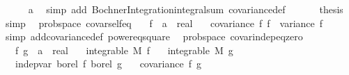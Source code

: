 \begin{isabellebody}
\ \ \ \ \isamarkupfalse%
\ a\ \isamarkupfalse%
\ {\isacharparenleft}{\kern0pt}simp\ add{\isacharcolon}{\kern0pt}\ Bochner{\isacharunderscore}{\kern0pt}Integration{\isachardot}{\kern0pt}integral{\isacharunderscore}{\kern0pt}sum\ covariance{\isacharunderscore}{\kern0pt}def{\isacharparenright}{\kern0pt}\ \isanewline
\ \ \isamarkupfalse%
\ \isamarkupfalse%
\ {\isacharquery}{\kern0pt}thesis\ \isamarkupfalse%
\ simp\isanewline
{}\isamarkupfalse%
%
\endisatagproof
{\isafoldproof}%
%
\isadelimproof
\isanewline
%
\endisadelimproof
\isanewline
{}\isamarkupfalse%
\ {\isacharparenleft}{\kern0pt}\ prob{\isacharunderscore}{\kern0pt}space{\isacharparenright}{\kern0pt}\ covar{\isacharunderscore}{\kern0pt}self{\isacharunderscore}{\kern0pt}eq{\isacharcolon}{\kern0pt}\isanewline
\ \ \ f\ {\isacharcolon}{\kern0pt}{\isacharcolon}{\kern0pt}\ {\isachardoublequoteopen}{\isacharprime}{\kern0pt}a\ {\isasymRightarrow}\ real{\isachardoublequoteclose}\isanewline
\ \ \ {\isachardoublequoteopen}covariance\ f\ f\ {\isacharequal}{\kern0pt}\ variance\ f{\isachardoublequoteclose}\isanewline
%
\isadelimproof
\ \ %
\endisadelimproof
%
\isatagproof
{}\isamarkupfalse%
\ {\isacharparenleft}{\kern0pt}simp\ add{\isacharcolon}{\kern0pt}covariance{\isacharunderscore}{\kern0pt}def\ power{}{\isacharunderscore}{\kern0pt}eq{\isacharunderscore}{\kern0pt}square{\isacharparenright}{\kern0pt}%
\endisatagproof
{\isafoldproof}%
%
\isadelimproof
\isanewline
%
\endisadelimproof
\isanewline
{}\isamarkupfalse%
\ {\isacharparenleft}{\kern0pt}\ prob{\isacharunderscore}{\kern0pt}space{\isacharparenright}{\kern0pt}\ covar{\isacharunderscore}{\kern0pt}indep{\isacharunderscore}{\kern0pt}eq{\isacharunderscore}{\kern0pt}zero{\isacharcolon}{\kern0pt}\isanewline
\ \ \ f\ g\ {\isacharcolon}{\kern0pt}{\isacharcolon}{\kern0pt}\ {\isachardoublequoteopen}{\isacharprime}{\kern0pt}a\ {\isasymRightarrow}\ real{\isachardoublequoteclose}\isanewline
\ \ \ {\isachardoublequoteopen}integrable\ M\ f{\isachardoublequoteclose}\isanewline
\ \ \ {\isachardoublequoteopen}integrable\ M\ g{\isachardoublequoteclose}\isanewline
\ \ \ {\isachardoublequoteopen}indep{\isacharunderscore}{\kern0pt}var\ borel\ f\ borel\ g{\isachardoublequoteclose}\isanewline
\ \ \ {\isachardoublequoteopen}covariance\ f\ g\ {\isacharequal}{\kern0pt}\ {}{\isachardoublequoteclose}\isanewline

\end{isabellebody}
